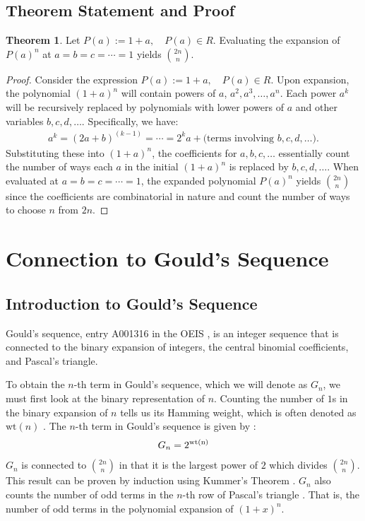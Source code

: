 \documentclass{article}
\theoremstyle{plain}
\theoremstyle{definition}
\newtheorem{thm}{Theorem}
\begin{document}
\subsection{Theorem Statement and Proof}
\begin{thm}
\label{thm:1}
    Let \( P(a) := 1+a, \quad P(a) \in R\). Evaluating the expansion of \(P(a)^n\) at \( a=b=c=\cdots=1 \) yields \( \binom{2n}{n} \).
\end{thm}
\begin{proof}
    Consider the expression \( P(a) := 1+a, \quad P(a) \in R \). Upon expansion, the polynomial \( (1+a)^n \) will contain powers of \(a\), \(a^2, a^3, \ldots, a^n\). Each power \(a^k\) will be recursively replaced by polynomials with lower powers of \(a\) and other variables \(b, c, d, \ldots\). Specifically, we have:
    \begin{align*}
        a^k = (2a+b)^{(k-1)} = \cdots = 2^k a + \text{(terms involving \(b, c, d, \ldots\))}.
    \end{align*}
    Substituting these into \((1+a)^n\), the coefficients for \(a, b, c, \ldots\) essentially count the number of ways each \(a\) in the initial \((1+a)^n\) is replaced by \(b, c, d, \ldots\). When evaluated at \(a=b=c=\cdots=1\), the expanded polynomial \(P(a)^n\) yields \(\binom{2n}{n}\) since the coefficients are combinatorial in nature and count the number of ways to choose \(n\) from \(2n\).
\end{proof}

\section{Connection to Gould's Sequence}
\subsection{Introduction to Gould's Sequence}
Gould's sequence, entry A001316 in the OEIS \cite{A001316}, is an integer sequence that is connected to the binary expansion of integers, the central binomial coefficients, and Pascal's triangle.

To obtain the \(n\)-th term in Gould's sequence, which we will denote as \(G_n\), we must first look at the binary representation of \(n\). Counting the number of \(1\)s in the binary expansion of \(n\) tells us its Hamming weight, which is often denoted as \( \text{wt}(n) \) \cite{Lin2004}. The \(n\)-th term in Gould's sequence is given by \cite{A001316}:
\begin{align}
    G_n = 2^\text{\text{wt}(n)}
\end{align}
\(G_n\) is connected to \(\binom{2n}{n}\) in that it is the largest power of \(2\) which divides \(\binom{2n}{n}\). This result can be proven by induction using Kummer's Theorem \cite{Kummer1857}. \(G_n\) also counts the number of odd terms in the \(n\)-th row of Pascal's triangle \cite{Glaisher1899}. That is, the number of odd terms in the polynomial expansion of \( (1+x)^n \).
\end{document}
